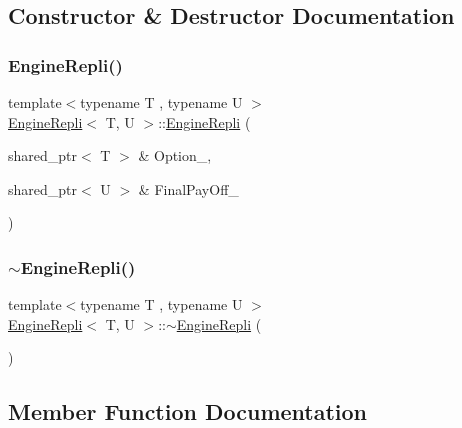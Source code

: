 \subsection{Constructor \& Destructor Documentation}
\hypertarget{classEngineRepli_a77ada5e83eb12eaf6b19b0826847cb7d}{}\label{classEngineRepli_a77ada5e83eb12eaf6b19b0826847cb7d} 
\subsubsection{\texorpdfstring{Engine\+Repli()}{EngineRepli()}}
{\footnotesize\ttfamily template$<$typename T , typename U $>$ \\
\hyperlink{classEngineRepli}{Engine\+Repli}$<$ T, U $>$\+::\hyperlink{classEngineRepli}{Engine\+Repli} (\begin{DoxyParamCaption}\item[{shared\+\_\+ptr$<$ T $>$ \&}]{Option\+\_\+,  }\item[{shared\+\_\+ptr$<$ U $>$ \&}]{Final\+Pay\+Off\+\_\+ }\end{DoxyParamCaption})\hspace{0.3cm}{\ttfamily [inline]}}

\hypertarget{classEngineRepli_a328a6ae729326cced7a986a94c8fc45e}{}\label{classEngineRepli_a328a6ae729326cced7a986a94c8fc45e} 
\subsubsection{\texorpdfstring{$\sim$\+Engine\+Repli()}{~EngineRepli()}}
{\footnotesize\ttfamily template$<$typename T , typename U $>$ \\
\hyperlink{classEngineRepli}{Engine\+Repli}$<$ T, U $>$\+::$\sim$\hyperlink{classEngineRepli}{Engine\+Repli} (\begin{DoxyParamCaption}{ }\end{DoxyParamCaption})\hspace{0.3cm}{\ttfamily [inline]}}



\subsection{Member Function Documentation}
\hypertarget{classEngineRepli_a3dcaf8e4c17db01c3293aafd0f38c670}{}\label{classEngineRepli_a3dcaf8e4c17db01c3293aafd0f38c670} 
